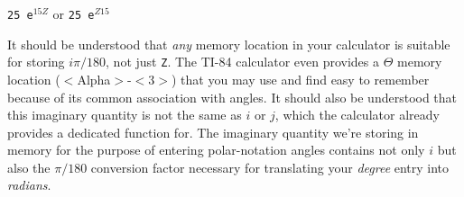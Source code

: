 \vskip 10pt

{\tt 25 e$^{15Z}$} \hskip 10pt or \hskip 10pt {\tt 25 e$^{Z15}$}

\vskip 10pt

It should be understood that {\it any} memory location in your calculator is suitable for storing $i \pi / 180$, not just {\tt Z}.  The TI-84 calculator even provides a $\Theta$ memory location ($<$Alpha$>$-$<$3$>$) that you may use and find easy to remember because of its common association with angles.  It should also be understood that this imaginary quantity is not the same as $i$ or $j$, which the calculator already provides a dedicated function for.  The imaginary quantity we're storing in memory for the purpose of entering polar-notation angles contains not only $i$ but also the $\pi / 180$ conversion factor necessary for translating your {\it degree} entry into {\it radians}.  










